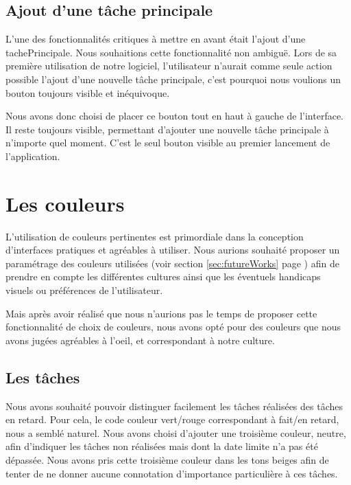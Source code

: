 \documentclass[11pt]{article}
\begin{document}
\subsection{Ajout d'une tâche principale}

L'une des fonctionnalités critiques à mettre en avant était l'ajout
d'une \gls{tachePrincipale}. Nous souhaitions cette fonctionnalité non
ambiguë. Lors de sa première utilisation de notre logiciel,
l'utilisateur n'aurait comme seule action possible l'ajout d'une
nouvelle tâche principale, c'est pourquoi nous voulions un bouton
toujours visible et inéquivoque.

Nous avons donc choisi de placer ce bouton tout en haut à gauche de
l'interface. Il reste toujours visible, permettant d'ajouter une
nouvelle tâche principale à n'importe quel moment. C'est le seul
bouton visible au premier lancement de l'application.


\section{Les couleurs}

L'utilisation de couleurs pertinentes est primordiale dans la
conception d'interfaces pratiques et agréables à utiliser. Nous
aurions souhaité proposer un paramétrage des couleurs utilisées (voir
section \ref{sec:futureWorks} page \pageref{sec:futureWorks}) afin de
prendre en compte les différentes cultures ainsi que les éventuels
handicaps visuels ou préférences de l'utilisateur.

Mais après avoir réalisé que nous n'aurions pas le temps de proposer
cette fonctionnalité de choix de couleurs, nous avons opté pour des
couleurs que nous avons jugées agréables à l'oeil, et correspondant à
notre culture.


\subsection{Les tâches}

Nous avons souhaité pouvoir distinguer facilement les tâches réalisées
des tâches en retard. Pour cela, le code couleur vert/rouge
correspondant à fait/en retard, nous a semblé naturel. Nous avons
choisi d'ajouter une troisième couleur, neutre, afin d'indiquer les
tâches non réalisées mais dont la date limite n'a pas été dépassée.
Nous avons pris cette troisième couleur dans les tons beiges afin de
tenter de ne donner aucune connotation d'importance particulière à ces
tâches.
\end{document}
